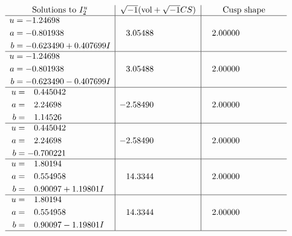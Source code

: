 \documentclass[1p]{elsarticle_modified}
\theoremstyle{definition}
\newcommand{\I}{\sqrt{-1}}
\begin{document}
$$\begin{array}{c|c|c}  
\text{Solutions to }I^u_{2}& \I (\text{vol} + \sqrt{-1}CS) & \text{Cusp shape}\\
 \hline 
\begin{aligned}
u &= -1.24698\phantom{ +0.000000I} \\
a &= -0.801938\phantom{ +0.000000I} \\
b &= -0.623490 + 0.407699 I\end{aligned}
 & \phantom{-}3.05488\phantom{ +0.000000I} & \phantom{-}2.00000\phantom{ +0.000000I} \\ \hline\begin{aligned}
u &= -1.24698\phantom{ +0.000000I} \\
a &= -0.801938\phantom{ +0.000000I} \\
b &= -0.623490 - 0.407699 I\end{aligned}
 & \phantom{-}3.05488\phantom{ +0.000000I} & \phantom{-}2.00000\phantom{ +0.000000I} \\ \hline\begin{aligned}
u &= \phantom{-}0.445042\phantom{ +0.000000I} \\
a &= \phantom{-}2.24698\phantom{ +0.000000I} \\
b &= \phantom{-}1.14526\phantom{ +0.000000I}\end{aligned}
 & -2.58490\phantom{ +0.000000I} & \phantom{-}2.00000\phantom{ +0.000000I} \\ \hline\begin{aligned}
u &= \phantom{-}0.445042\phantom{ +0.000000I} \\
a &= \phantom{-}2.24698\phantom{ +0.000000I} \\
b &= -0.700221\phantom{ +0.000000I}\end{aligned}
 & -2.58490\phantom{ +0.000000I} & \phantom{-}2.00000\phantom{ +0.000000I} \\ \hline\begin{aligned}
u &= \phantom{-}1.80194\phantom{ +0.000000I} \\
a &= \phantom{-}0.554958\phantom{ +0.000000I} \\
b &= \phantom{-}0.90097 + 1.19801 I\end{aligned}
 & \phantom{-}14.3344\phantom{ +0.000000I} & \phantom{-}2.00000\phantom{ +0.000000I} \\ \hline\begin{aligned}
u &= \phantom{-}1.80194\phantom{ +0.000000I} \\
a &= \phantom{-}0.554958\phantom{ +0.000000I} \\
b &= \phantom{-}0.90097 - 1.19801 I\end{aligned}
 & \phantom{-}14.3344\phantom{ +0.000000I} & \phantom{-}2.00000\phantom{ +0.000000I}\\
 \hline 
 \end{array}$$\newpage\newpage\renewcommand{\arraystretch}{1}
\end{document}
